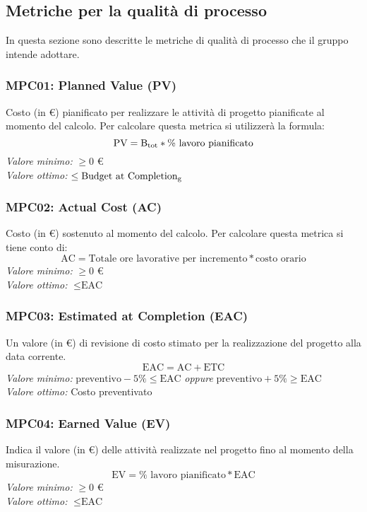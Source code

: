 \subsection{Metriche per la qualità di processo}
In questa sezione sono descritte le metriche di qualità di processo che il gruppo intende adottare.

\subsubsection{MPC01: Planned Value (PV)}
Costo (in \euro) pianificato per realizzare le attività di progetto pianificate al momento del calcolo.
Per calcolare questa metrica si utilizzerà la formula:
\begin{equation*}
\text{PV}=\text{B}\textsubscript{tot}*\%\text{ lavoro pianificato}
\end{equation*}
\textit{Valore minimo:} $\ge 0$ \euro\\
\textit{Valore ottimo:}	$\le \text{Budget at Completion\textsubscript{g}}$
\subsubsection{MPC02: Actual Cost (AC)}
Costo (in \euro) sostenuto al momento del calcolo.
Per calcolare questa metrica si tiene conto di:
\begin{equation*}
\text{AC}=\text{Totale ore lavorative per incremento}*\text{costo orario}
\end{equation*}
\textit{Valore minimo:} $\ge 0$ \euro\\
\textit{Valore ottimo:} $\le \text{EAC}$
\subsubsection{MPC03: Estimated at Completion (EAC)}
Un valore (in \euro) di revisione di costo stimato per la realizzazione del progetto alla data corrente.
\begin{equation*}
\text{EAC}=\text{AC}+\text{ETC}
\end{equation*}
\textit{Valore minimo:} 
$\text{preventivo} -5\% \le \text{EAC}$ \textit{oppure} $\text{preventivo} +5\% \ge \text{EAC}$\\
\textit{Valore ottimo:} Costo preventivato
\subsubsection{MPC04: Earned Value (EV)}
Indica il valore (in \euro) delle attività realizzate nel progetto fino al momento della misurazione.
\begin{equation*}
\text{EV}=\%\text{ lavoro pianificato}*\text{EAC}
\end{equation*}
\textit{Valore minimo:} $\ge 0$ \euro\\
\textit{Valore ottimo:} $\le \text{EAC}$
